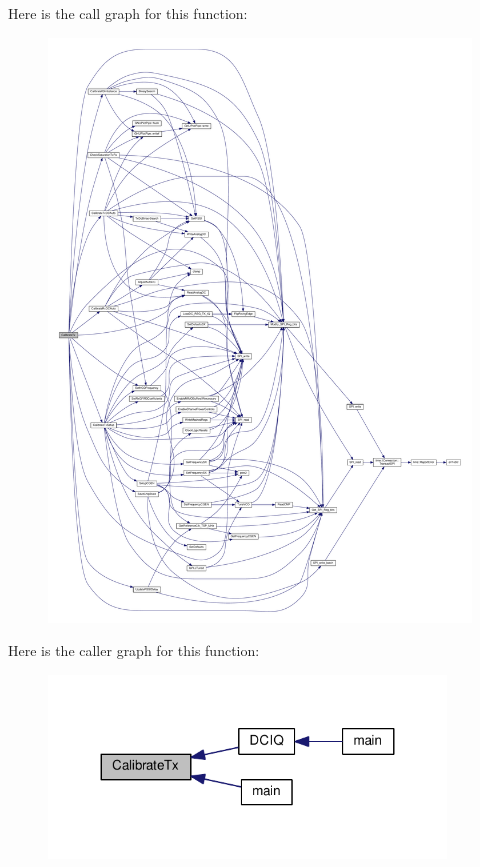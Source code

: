 Here is the call graph for this function\+:
\nopagebreak
\begin{figure}[H]
\begin{center}
\leavevmode
\includegraphics[width=350pt]{d1/dc7/lms7002m__calibrations_8h_a208452a11189052c6dcd2fe639e4fcae_cgraph}
\end{center}
\end{figure}




Here is the caller graph for this function\+:
\nopagebreak
\begin{figure}[H]
\begin{center}
\leavevmode
\includegraphics[width=299pt]{d1/dc7/lms7002m__calibrations_8h_a208452a11189052c6dcd2fe639e4fcae_icgraph}
\end{center}
\end{figure}


